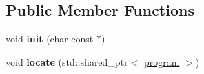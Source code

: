 \subsection*{\-Public \-Member \-Functions}
\begin{DoxyCompactItemize}
\item 
\hypertarget{classglutpp_1_1glsl_1_1Uniform_1_1Scalar_1_1Base_a3d0871209e815b289351d3e98da7608d}{void {\bfseries init} (char const $\ast$)}\label{classglutpp_1_1glsl_1_1Uniform_1_1Scalar_1_1Base_a3d0871209e815b289351d3e98da7608d}

\item 
\hypertarget{classglutpp_1_1glsl_1_1Uniform_1_1Scalar_1_1Base_a0c55cc132bcf9b9f23886ba46641e3e9}{void {\bfseries locate} (std\-::shared\-\_\-ptr$<$ \hyperlink{classglutpp_1_1glsl_1_1program}{program} $>$)}\label{classglutpp_1_1glsl_1_1Uniform_1_1Scalar_1_1Base_a0c55cc132bcf9b9f23886ba46641e3e9}

\end{DoxyCompactItemize}
